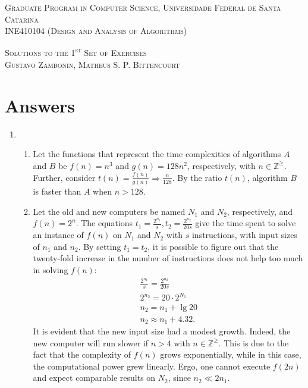 \documentclass[12pt]{article}
\newcommand{\intwzero}{\mathbb{Z}^{\geq}}
\begin{document}
\textsc{Graduate Program in Computer Science,
  Universidade Federal de Santa Catarina} \\
\textsc{INE410104 (Design and Analysis of Algorithms)}

\textsc{Solutions to the 1\textsuperscript{st} Set of Exercises} \\
\textsc{Gustavo Zambonin, Matheus S. P. Bittencourt}

\section{Answers}

\begin{enumerate}
  \item
  \begin{enumerate}
    \item Let the functions that represent the time complexities of algorithms $A$ and $B$ be $f(n) = n^{3}$ and $g(n) = 128n^{2}$, respectively, with $n \in \intwzero$. Further, consider $t(n) = \frac{f(n)}{g(n)} \Rightarrow \frac{n}{128}$. By the ratio $t(n)$, algorithm $B$ is faster than $A$ when $n > 128$.
    
    \item Let the old and new computers be named $N_{1}$ and $N_{2}$, respectively, and $f(n) = 2^{n}$. The equations $t_{1} = \frac{2^{n_{1}}}{s}, t_{2} = \frac{2^{n_{2}}}{20s}$ give the time spent to solve an instance of $f(n)$ on $N_{1}$ and $N_{2}$ with $s$ instructions, with input sizes of $n_{1}$ and $n_{2}$. By setting $t_{1} = t_{2}$, it is possible to figure out that the twenty-fold increase in the number of instructions does not help too much in solving $f(n)$:
    \begin{align*}
      \tfrac{2^{n_{1}}}{s} = \tfrac{2^{n_{2}}}{20s} \\
      2^{n_{2}} = 20 \cdot 2^{N_{1}} \\
      n_{2} = n_{1} + \lg 20 \\
      n_{2} \approx n_{1} + 4.32.
    \end{align*}
    It is evident that the new input size had a modest growth. Indeed, the new computer will run slower if $n > 4$ with $n \in \intwzero$. This is due to the fact that the complexity of $f(n)$ grows exponentially, while in this case, the computational power grew linearly. Ergo, one cannot execute $f(2n)$ and expect comparable results on $N_{2}$, since $n_{2} \ll 2 n_{1}$.
  \end{enumerate}
  

\end{enumerate}
\end{document}
